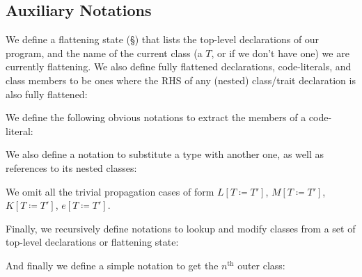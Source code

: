\subsection{Auxiliary Notations}
We define a flattening state (\S) that lists the top-level declarations of our program, and the name of the current class (a $T$, or \Empty if we don't have one) we are currently flattening. We also define fully flattened declarations, code-literals, and class members to be ones where the RHS of any (nested) class/trait declaration is also fully flattened:

\begin{grammar}
	\color{blue}
	\midrule
\end{grammar}


We define the following obvious notations to extract the members of a code-literal:

\begin{defs}
\end{defs}

We also define a notation to substitute a type with another one, as well as references to its nested classes:

\begin{defs}
\end{defs}
We omit all the trivial propagation cases of form $L[T \coloneqq T']$, $M[T \coloneqq T']$, $K[T \coloneqq T']$, $e[T \coloneqq T']$.


Finally, we recursively define notations to lookup and modify classes from a set of top-level declarations or flattening state:

\begin{defs}
\color{blue}
\color{blue}
\color{blue}
\color{blue}
\end{defs}
And finally we define a simple notation to get the $n^\text{th}$ outer class:


